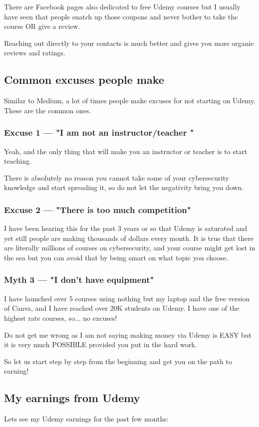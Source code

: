 \documentclass[11pt]{article}
\begin{document}
There are Facebook pages also dedicated to free Udemy courses but I usually have seen that people snatch up those coupons and never bother to take the course OR give a review.

Reaching out directly to your contacts is much better and gives you more organic reviews and ratings.

\subsection*{Common excuses people make}
Similar to Medium, a lot of times people make excuses for not starting on Udemy. These are the common ones.

\subsubsection*{Excuse 1 — "I am not an instructor/teacher "}
Yeah, and the only thing that will make you an instructor or teacher is to start teaching.

There is absolutely no reason you cannot take some of your cybersecurity knowledge and start spreading it, so do not let the negativity bring you down.

\subsubsection*{Excuse 2 — "There is too much competition"}
I have been hearing this for the past 3 years or so that Udemy is saturated and yet still people are making thousands of dollars every month. It is true that there are literally millions of courses on cybersecurity, and your course might get lost in the sea but you can avoid that by being smart on what topic you choose.

\subsubsection*{Myth 3 — "I don't have equipment"}
I have launched over 5 courses using nothing but my laptop and the free version of Canva, and I have reached over 20K students on Udemy. I have one of the highest rate courses, so... no excuses!

Do not get me wrong as I am not saying making money via Udemy is EASY but it is very much POSSIBLE provided you put in the hard work.

So let us start step by step from the beginning and get you on the path to earning!

\subsection*{My earnings from Udemy}
Lets see my Udemy earnings for the past few months:
\end{document}
